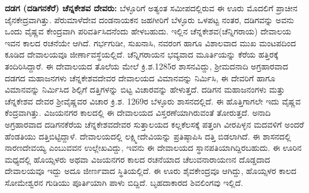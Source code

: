 \textbf{ದಡಗ (ದಡಿಗನಕೆರೆ) ಚೆನ್ನಕೇಶವ ದೇವರು:} ಬೆಳ್ಳೂರಿಗೆ ಅತ್ಯಂತ ಸಮೀಪದಲ್ಲಿರುವ ಈ ಊರು ಮೊದಲಿಗೆ ಪ್ರಾಚೀನ ಜೈನಕೇದ್ರವಾಗಿತ್ತು. ಪೆರುಮಾಳೆದೇವ ದಂಡನಾಯಕನ ಜಹಗೀರಿಗೆ ಬೆಳ್ಳೂರು ಒಳಪಟ್ಟ ನಂತರ, ದಡಿಗವನ್ನು ಅವನು ಒಂದು ವೈಷ್ಣವ ಕೇಂದ್ರವಾಗಿ ಪರಿವರ್ತಿಸಿದನೆಂದು ಹೇಳಬಹುದು. ಇಲ್ಲಿನ ಚೆನ್ನಕೇಶವ(ಚೆನ್ನಿಗರಾಯ) ದೇವಾಲಯ ಇವನ ಕಾಲದ ರಚನೆಯೇ ಆಗಿದೆ. ಗರ್ಭಗುಡೀ, ಸುಖನಾಸಿ, ನವರಂಗ ಹಾಗೂ ವಿಶಾಲವಾದ ಮುಖ ಮಂಟಪದಿಂದ ಕೂಡಿದ ದೇವಾಲಯವೂ ಜೀರ್ಣಾವಸ್ಥೆಯಲ್ಲಿದೆ. ಚೆನ್ನಿಗರಾಯನ ಭವ್ಯವಾದ ಮೂರ್ತಿಯನ್ನು ಕೆರೆಯ ಹತ್ತಿರಕ್ಕೆ ತಂದಿರಿಸಿದ್ದಾರೆ. ಈ ದೇವಾಲಯದ ತೊಲೆಯ ಮೇಲೆ ಕ್ರಿ.ಶ.1285ರ ಶಾಸನವಿದ್ದು, ಶ‍್ರೀಮದನಾದಿ ಅಗ್ರಹಾರವಾದ ದಡಗದ ಮಹಾಜನಗಳು ಚೆನ್ನಕೇಶವದೇವರ ದೇವಾಲಯದ ವಿಮಾನವನ್ನು ನಿರ್ಮಿಸಿ, ಈ ದೇವರಿಗೆ ಹಾಗೂ ವಿಮಾನವನ್ನು ನಿರ್ಮಿಸಿದ ಶಿಲ್ಪಿಗೆ ದತ್ತಿಗಳನ್ನು ಬಿಟ್ಟ ವಿಚಾರವನ್ನು ಹೇಳುತ್ತದೆ. ದಡಿಗನ ಮಹಾಜನಂಗಳು ಮತ್ತು ಚೆನ್ನಕೇಶವ ದೇವರ ಶ‍್ರೀವೈಷ್ಣವರ ವಿಚಾರ ಕ್ರಿ.ಶ. 1269ರ ಬೆಳ್ಳೂರು ಶಾಸನದಲ್ಲಿದೆ. ಈ ಹೊತ್ತಿಗಾಗಲೇ ಇದು ವೈಷ್ಣವ ಕೆಂದ್ರವಾಗಿತ್ತು. ವಿಜಯನಗರ ಕಾಲದಲ್ಲಿ ಈ ದೇವಾಲಯದ ವಿಸ್ತರಣೆಯಾಗಿರುವಂತೆ ತೋರುತ್ತದೆ. ಅನಾದಿ ಅಗ್ರಹಾರವಾದ ದಡಿಗನಕೆರೆಯ ಚೆನ್ನಕೇಶವದೇವರ ಸುತ್ತಾಲಯದ ಕಲ್ಲಕೆಲಸಕ್ಕೆ ಪತ್ತಂಗಿ ವೀರಪಿಳ್ಳನ ಮದವಳಿಗೆ ಅಂದರೆ ಹೆಂಡತಿಯು ದತ್ತಿಬಿಟ್ಟಿದ್ದಾಳೆ. ದೇವಾಲಯದಲ್ಲಿ ಲಕ್ಷ್ಮೀದೇವಿಯನ್ನು ಪ್ರತಿಷ್ಠಾಪಿಸಿ ದತ್ತಿ ಬಿಡಲಾಗಿದೆ. ಈ ಶಾಸನದಲ್ಲಿ ನಾರಣದೇವಯ್ಯ ಎಂಬುವವನ ಉಲ್ಲೇಖವಿದ್ದು, ಇವನು ಈ ದೇವಾಲಯದ ಸ್ಥಾನಪತಿಯಾಗಿದ್ದಿರಬಹುದು. ಈ ಊರಿನ ಮಧ್ಯದಲ್ಲಿ ಹೊಯ್ಸಳರು ಅಥವಾ ವಿಜಯನಗರ ಕಾಲದ ರಚನೆಯಾದ ಚೆಲುವನಾರಾಯಣನ ದೊಡ್ಡದಾದ ದೇವಾಲಯವೂ ಇದ್ದು ಅದೂ ಜೀರ್ಣವಾದ ಸ್ಥಿತಿಯಲ್ಲಿದೆ. ಈ ಊರು ಶೈವಕೇಂದ್ರವೂ ಆಗಿದ್ದು, ಹೊಯ್ಸಳರ ಕಾಲದ ಸೋಮೇಶ್ವರನ ಗುಡಿಯು ಪೂರ್ತಿಯಾಗಿ ಪಾಳು ಬಿದ್ದಿದೆ. ಬೃಹದಾಕಾರದ ಶಿವಲಿಂಗವು ಇಲ್ಲಿದೆ.

